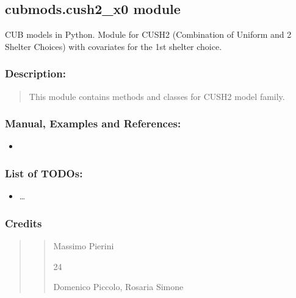 \documentclass[letterpaper,10pt,english]{sphinxmanual}
\begin{document}
\subsection{cubmods.cush2\_x0 module}
\label{\detokenize{cubmods:module-cubmods.cush2_x0}}\label{\detokenize{cubmods:cubmods-cush2-x0-module}}\label{\detokenize{cubmods:cush2x0-module}}
\sphinxAtStartPar
CUB models in Python.
Module for CUSH2 (Combination of Uniform
and 2 Shelter Choices) with covariates
for the 1st shelter choice.


\subsubsection{Description:}
\label{\detokenize{cubmods:id53}}\begin{quote}

\sphinxAtStartPar
This module contains methods and classes
for CUSH2 model family.
\end{quote}


\subsubsection{Manual, Examples and References:}
\label{\detokenize{cubmods:id54}}\begin{itemize}
\item {} 
\sphinxAtStartPar
{}

\end{itemize}


\subsubsection{List of TODOs:}
\label{\detokenize{cubmods:id55}}\begin{itemize}
\item {} 
\sphinxAtStartPar
…

\end{itemize}


\subsubsection{Credits}
\label{\detokenize{cubmods:id56}}\begin{quote}
\begin{quote}\begin{description}
\sphinxAtStartPar
Massimo Pierini

\sphinxhyphen{}24

\sphinxAtStartPar
Domenico Piccolo, Rosaria Simone

\sphinxAtStartPar
{}

\end{description}\end{quote}
\end{quote}
\end{document}
